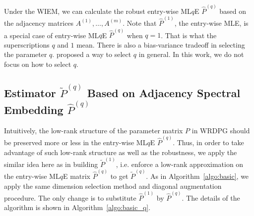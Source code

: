 \documentclass[a4paper]{article}
\renewcommand{\hat}{\widehat}
\begin{document}
Under the WIEM, we can calculate the robust entry-wise ML$q$E $\hat{P}^{(q)}$ based on the adjacency matrices $A^{(1)}, \dotsc, A^{(m)}$. Note that $\hat{P}^{(1)}$, the entry-wise MLE, is a special case of entry-wise ML$q$E $\hat{P}^{(q)}$ when $q = 1$. That is what the superscriptions $q$ and $1$ mean. There is also a bias-variance tradeoff in selecting the parameter $q$. \citet{qin2013robust} proposed a way to select $q$ in general. In this work, we do not focus on how to select $q$.



\subsection{Estimator $\widetilde{P}^{(q)}$ Based on Adjacency Spectral Embedding $\hat{P}^{(q)}$}

Intuitively, the low-rank structure of the parameter matrix $P$ in WRDPG should be preserved more or less in the entry-wise ML$q$E $\hat{P}^{(q)}$. Thus, in order to take advantage of such low-rank structure as well as the robustness, we apply the similar idea here as in building $\widetilde{P}^{(1)}$, i.e. enforce a low-rank approximation on the entry-wise ML$q$E matrix $\hat{P}^{(q)}$ to get $\widetilde{P}^{(q)}$. As in Algorithm~\ref{algo:basic}, we apply the same dimension selection method and diagonal augmentation procedure. The only change is to substitute $\hat{P}^{(1)}$ by $\hat{P}^{(q)}$. The details of the algorithm is shown in Algorithm~\ref{algo:basic_q}.

\end{document}
